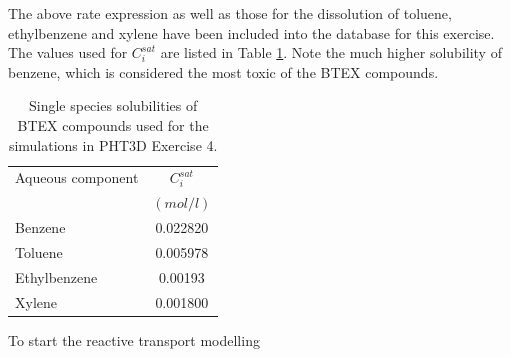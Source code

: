 The above rate expression as well as those for the dissolution
of toluene, ethylbenzene and xylene have been included into the database
for this exercise. The values used for $C_{i}^{sat}$ are 
listed in Table \ref{solub_single_species}. Note the much higher
solubility of benzene, which is considered the most toxic of the
BTEX compounds.

\begin{table}[b]
\caption{Single species solubilities of BTEX compounds used for the simulations
in PHT3D Exercise 4.}
\begin{center}
\begin{tabular}{l c }
\toprule
Aqueous component    & $C_{i}^{sat}$     \\
                     & $(mol/l)$        \\ 
\midrule
Benzene              &  0.022820  \\
Toluene              &  0.005978  \\
Ethylbenzene         &  0.00193   \\
Xylene               &  0.001800  \\
\bottomrule

\end{tabular}
\label{solub_single_species}
\end{center}
\end{table}

To start the reactive transport modelling

